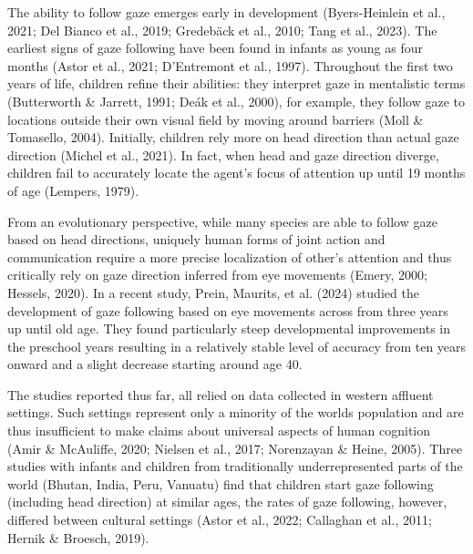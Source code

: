\documentclass[
  man,floatsintext]{apa7}
\begin{document}
The ability to follow gaze emerges early in development (Byers-Heinlein et al., 2021; Del Bianco et al., 2019; Gredebäck et al., 2010; Tang et al., 2023). The earliest signs of gaze following have been found in infants as young as four months (Astor et al., 2021; D'Entremont et al., 1997). Throughout the first two years of life, children refine their abilities: they interpret gaze in mentalistic terms (Butterworth \& Jarrett, 1991; Deák et al., 2000), for example, they follow gaze to locations outside their own visual field by moving around barriers (Moll \& Tomasello, 2004). Initially, children rely more on head direction than actual gaze direction (Michel et al., 2021). In fact, when head and gaze direction diverge, children fail to accurately locate the agent's focus of attention up until 19 months of age (Lempers, 1979).

From an evolutionary perspective, while many species are able to follow gaze based on head directions, uniquely human forms of joint action and communication require a more precise localization of other's attention and thus critically rely on gaze direction inferred from eye movements (Emery, 2000; Hessels, 2020). In a recent study, Prein, Maurits, et al. (2024) studied the development of gaze following based on eye movements across from three years up until old age. They found particularly steep developmental improvements in the preschool years resulting in a relatively stable level of accuracy from ten years onward and a slight decrease starting around age 40.

The studies reported thus far, all relied on data collected in western affluent settings. Such settings represent only a minority of the worlds population and are thus insufficient to make claims about universal aspects of human cognition (Amir \& McAuliffe, 2020; Nielsen et al., 2017; Norenzayan \& Heine, 2005). Three studies with infants and children from traditionally underrepresented parts of the world (Bhutan, India, Peru, Vanuatu) find that children start gaze following (including head direction) at similar ages, the rates of gaze following, however, differed between cultural settings (Astor et al., 2022; Callaghan et al., 2011; Hernik \& Broesch, 2019).
\end{document}
